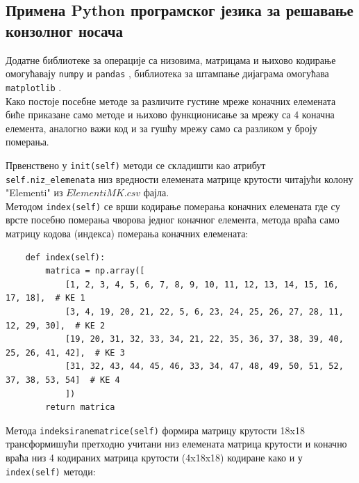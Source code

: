 \documentclass[11pt, a4paper]{article}
\begin{document}
\subsection{Примена Python програмског језика за решавање конзолног носача}
Додатне библиотеке за операције са низовима, матрицама и њихово кодирање омогућавају \texttt{numpy} \cite{numpy} и \texttt{pandas} \cite{pandas}, библиотека за штампање дијаграма омогућава \texttt{matplotlib} \cite{matplotlib}. \\
Како постоје посебне методе за различите густине мреже коначних елемената биће приказане само методе и њихово функционисање за мрежу са 4 коначна елемента, аналогно важи код и за гушћу мрежу само са разликом у броју померања.
\par
Првенствено у \texttt{init(self)} методи се складишти као атрибут  \\
\texttt{self.niz\_elemenata} низ вредности елемената матрице крутости читајући колону "Elementi" из $ElementiMK.csv$ фајла.\\
Методом \texttt{index(self)} се врши кодирање померања коначних елемената где су врсте посебно померања чворова једног коначног елемента, метода враћа само матрицу кодова (индекса) померања коначних елемената:
\begin{lstlisting}
    def index(self):
        matrica = np.array([
            [1, 2, 3, 4, 5, 6, 7, 8, 9, 10, 11, 12, 13, 14, 15, 16, 17, 18],  # KE 1
            [3, 4, 19, 20, 21, 22, 5, 6, 23, 24, 25, 26, 27, 28, 11, 12, 29, 30],  # KE 2
            [19, 20, 31, 32, 33, 34, 21, 22, 35, 36, 37, 38, 39, 40, 25, 26, 41, 42],  # KE 3
            [31, 32, 43, 44, 45, 46, 33, 34, 47, 48, 49, 50, 51, 52, 37, 38, 53, 54]  # KE 4
            ])
        return matrica
\end{lstlisting}
Метода \texttt{indeksiranematrice(self)} формира матрицу крутости 18x18 трансформишући претходно учитани низ елемената матрица крутости и коначно враћа низ 4 кодираних матрица крутости (4x18x18) кодиране како и у \texttt{index(self)} методи:
\end{document}
